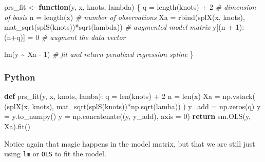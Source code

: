 \documentclass[
  letterpaper,
]{krantz}
\newenvironment{Shaded}{}{}
\newcommand{\BuiltInTok}[1]{\textcolor[rgb]{0.00,0.50,0.00}{#1}}
\newcommand{\CommentTok}[1]{\textcolor[rgb]{0.38,0.63,0.69}{\textit{#1}}}
\newcommand{\ControlFlowTok}[1]{\textcolor[rgb]{0.00,0.44,0.13}{\textbf{#1}}}
\newcommand{\DecValTok}[1]{\textcolor[rgb]{0.25,0.63,0.44}{#1}}
\newcommand{\FunctionTok}[1]{\textcolor[rgb]{0.02,0.16,0.49}{#1}}
\newcommand{\KeywordTok}[1]{\textcolor[rgb]{0.00,0.44,0.13}{\textbf{#1}}}
\newcommand{\NormalTok}[1]{#1}
\newcommand{\OperatorTok}[1]{\textcolor[rgb]{0.40,0.40,0.40}{#1}}
\newcommand{\OtherTok}[1]{\textcolor[rgb]{0.00,0.44,0.13}{#1}}
\newcommand{\SpecialCharTok}[1]{\textcolor[rgb]{0.25,0.44,0.63}{#1}}
\begin{document}
\begin{Shaded}
\begin{Highlighting}[]
\NormalTok{prs\_fit }\OtherTok{\textless{}{-}} \ControlFlowTok{function}\NormalTok{(y, x, knots, lambda) \{}
\NormalTok{  q  }\OtherTok{=} \FunctionTok{length}\NormalTok{(knots) }\SpecialCharTok{+} \DecValTok{2}    \CommentTok{\# dimension of basis}
\NormalTok{  n  }\OtherTok{=} \FunctionTok{length}\NormalTok{(x)            }\CommentTok{\# number of observations}
\NormalTok{  Xa }\OtherTok{=} \FunctionTok{rbind}\NormalTok{(}\FunctionTok{splX}\NormalTok{(x, knots), }\FunctionTok{mat\_sqrt}\NormalTok{(}\FunctionTok{splS}\NormalTok{(knots))}\SpecialCharTok{*}\FunctionTok{sqrt}\NormalTok{(lambda)) }\CommentTok{\# augmented model matrix}
\NormalTok{  y[(n }\SpecialCharTok{+} \DecValTok{1}\NormalTok{)}\SpecialCharTok{:}\NormalTok{(n}\SpecialCharTok{+}\NormalTok{q)] }\OtherTok{=} \DecValTok{0}      \CommentTok{\# augment the data vector}
  
  \FunctionTok{lm}\NormalTok{(y }\SpecialCharTok{\textasciitilde{}}\NormalTok{ Xa }\SpecialCharTok{{-}} \DecValTok{1}\NormalTok{) }\CommentTok{\# fit and return penalized regression spline}
\NormalTok{\}}
\end{Highlighting}
\end{Shaded}

\subsubsection{Python}

\begin{Shaded}
\begin{Highlighting}[]
\KeywordTok{def}\NormalTok{ prs\_fit(y, x, knots, lamba):}
\NormalTok{    q }\OperatorTok{=} \BuiltInTok{len}\NormalTok{(knots) }\OperatorTok{+} \DecValTok{2}
\NormalTok{    n }\OperatorTok{=} \BuiltInTok{len}\NormalTok{(x)}
\NormalTok{    Xa }\OperatorTok{=}\NormalTok{ np.vstack(}
\NormalTok{      (splX(x, knots), mat\_sqrt(splS(knots))}\OperatorTok{*}\NormalTok{np.sqrt(lamba))}
\NormalTok{      )}
\NormalTok{    y\_add }\OperatorTok{=}\NormalTok{ np.zeros(q)}
\NormalTok{    y }\OperatorTok{=}\NormalTok{ y.to\_numpy()}
\NormalTok{    y }\OperatorTok{=}\NormalTok{ np.concatenate((y, y\_add), axis }\OperatorTok{=} \DecValTok{0}\NormalTok{)}
    \ControlFlowTok{return}\NormalTok{ sm.OLS(y, Xa).fit()}
\end{Highlighting}
\end{Shaded}

Notice again that magic happens in the model matrix, but that we are
still just using \texttt{lm} or \texttt{OLS} to fit the model.
\end{document}
